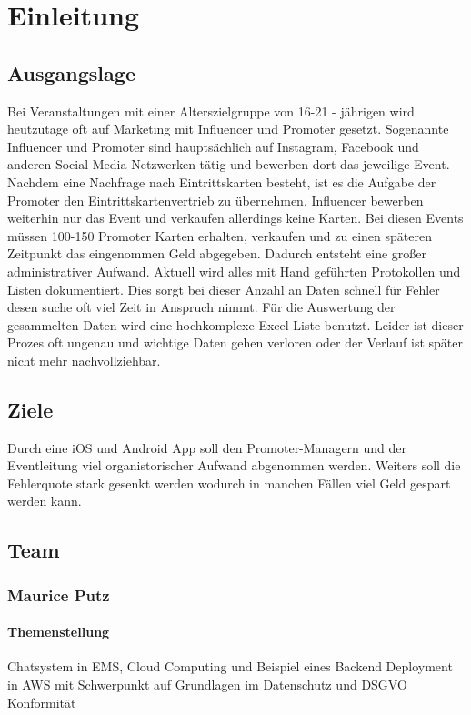 \chapter{Einleitung}
\section{Ausgangslage}
Bei Veranstaltungen mit einer Alterszielgruppe von 16-21 - jährigen wird heutzutage oft auf Marketing mit Influencer und Promoter gesetzt. 
Sogenannte Influencer und Promoter sind hauptsächlich auf Instagram, Facebook und anderen Social-Media Netzwerken tätig und bewerben dort das jeweilige Event. 
Nachdem eine Nachfrage nach Eintrittskarten besteht, ist es die Aufgabe der Promoter den Eintrittskartenvertrieb zu übernehmen. 
Influencer bewerben weiterhin nur das Event und verkaufen allerdings keine Karten. 
Bei diesen Events müssen 100-150 Promoter Karten erhalten, verkaufen und zu einen späteren Zeitpunkt das eingenommen Geld abgegeben. Dadurch entsteht eine großer 
administrativer Aufwand. Aktuell wird alles mit Hand geführten Protokollen und Listen dokumentiert. Dies sorgt bei dieser Anzahl an Daten schnell für Fehler desen suche
oft viel Zeit in Anspruch nimmt. Für die Auswertung der gesammelten Daten wird eine hochkomplexe Excel Liste benutzt. Leider ist dieser Prozes oft ungenau und wichtige 
Daten gehen verloren oder der Verlauf ist später nicht mehr nachvollziehbar. 

\section{Ziele}
Durch eine iOS und Android App soll den Promoter-Managern und der Eventleitung viel organistorischer Aufwand abgenommen werden. Weiters soll die Fehlerquote stark gesenkt werden
wodurch in manchen Fällen viel Geld gespart werden kann. 

\newpage
\section{Team}
\subsection{Maurice Putz}
\subsubsection{Themenstellung}
Chatsystem in EMS, Cloud Computing und Beispiel eines Backend Deployment in AWS mit Schwerpunkt auf Grundlagen im Datenschutz und DSGVO Konformität
